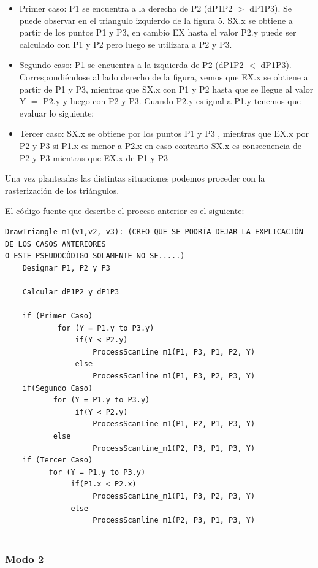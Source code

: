 \documentclass[a4paper]{article}
\begin{document}
\begin{itemize}
\item Primer caso: P1 se encuentra a la derecha de P2 (dP1P2 $>$ dP1P3). Se puede observar en el triangulo izquierdo de la figura 5. SX.x se obtiene a partir de los puntos P1 y P3, en cambio EX hasta el valor P2.y puede ser calculado con P1 y P2 pero luego se utilizara a P2 y P3.
\item Segundo caso: P1 se encuentra a la izquierda de P2 (dP1P2 $<$ dP1P3). Correspondiéndose al lado derecho de la figura, vemos que EX.x se obtiene a partir de P1 y P3, mientras que SX.x con P1 y P2 hasta que se llegue al valor Y $=$ P2.y y luego con P2 y P3. 
Cuando P2.y es igual a P1.y tenemos que evaluar lo siguiente:
\item Tercer caso:  SX.x se obtiene por los puntos P1 y P3 , mientras que EX.x por P2 y P3 si P1.x es menor a P2.x en caso contrario SX.x es consecuencia de P2 y P3 mientras que EX.x de P1 y P3 
\end{itemize}
Una vez planteadas las distintas situaciones podemos proceder con la rasterización de los triángulos. 
  
El código fuente que describe el proceso anterior es el siguiente:
\begin{verbatim}
DrawTriangle_m1(v1,v2, v3): (CREO QUE SE PODRÍA DEJAR LA EXPLICACIÓN DE LOS CASOS ANTERIORES 
O ESTE PSEUDOCÓDIGO SOLAMENTE NO SE.....)
    Designar P1, P2 y P3 
    
    Calcular dP1P2 y dP1P3
    
    if (Primer Caso)
            for (Y = P1.y to P3.y)      
                if(Y < P2.y)
                    ProcessScanLine_m1(P1, P3, P1, P2, Y)
                else
                    ProcessScanline_m1(P1, P3, P2, P3, Y)
    if(Segundo Caso)
           for (Y = P1.y to P3.y)       
                if(Y < P2.y)
                    ProcessScanLine_m1(P1, P2, P1, P3, Y)
           else
                    ProcessScanline_m1(P2, P3, P1, P3, Y)
    if (Tercer Caso)    
          for (Y = P1.y to P3.y)        
               if(P1.x < P2.x)
                    ProcessScanLine_m1(P1, P3, P2, P3, Y)
               else
                    ProcessScanline_m1(P2, P3, P1, P3, Y)
                                        
\end{verbatim}

 

\subsubsection{Modo 2} 
\end{document}

